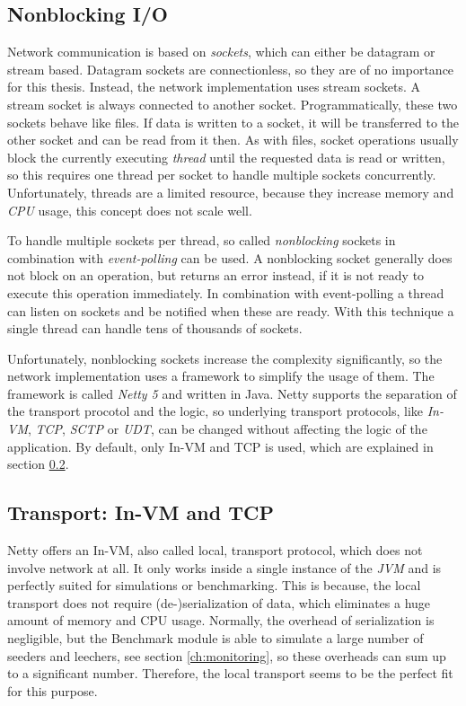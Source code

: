 \subsection{Nonblocking I/O}
Network communication is based on \emph{sockets}, which can either be datagram or stream based. Datagram sockets are connectionless, so they are of no importance for this thesis. Instead, the network implementation uses stream sockets. A stream socket is always connected to another socket. Programmatically, these two sockets behave like files. If data is written to a socket, it will be transferred to the other socket and can be read from it then. As with files, socket operations usually block the currently executing \emph{thread} until the requested data is read or written, so this requires one thread per socket to handle multiple sockets concurrently. Unfortunately, threads are a limited resource, because they increase memory and \emph{CPU} usage, this concept does not scale well.

To handle multiple sockets per thread, so called \emph{nonblocking} sockets in combination with \emph{event-polling} can be used. A nonblocking socket generally does not block on an operation, but returns an error instead, if it is not ready to execute this operation immediately. In combination with event-polling a thread can listen on sockets and be notified when these are ready. With this technique a single thread can handle tens of thousands of sockets.

Unfortunately, nonblocking sockets increase the complexity significantly, so the network implementation uses a framework to simplify the usage of them. The framework is called \emph{Netty 5} and written in Java. Netty supports the separation of the transport procotol and the logic, so underlying transport protocols, like \emph{In-VM}, \emph{TCP}, \emph{SCTP} or \emph{UDT}, can be changed without affecting the logic of the application. By default, only In-VM and TCP is used, which are explained in section \ref{subsec:transport}.

\subsection{Transport: In-VM and TCP}
\label{subsec:transport}
Netty offers an In-VM, also called local, transport protocol, which does not involve network at all. It only works inside a single instance of the \emph{JVM} and is perfectly suited for simulations or benchmarking. This is because, the local transport does not require (de-)serialization of data, which eliminates a huge amount of memory and CPU usage. Normally, the overhead of serialization is negligible, but the Benchmark module is able to simulate a large number of seeders and leechers, see section \ref{ch:monitoring}, so these overheads can sum up to a significant number. Therefore, the local transport seems to be the perfect fit for this purpose.

